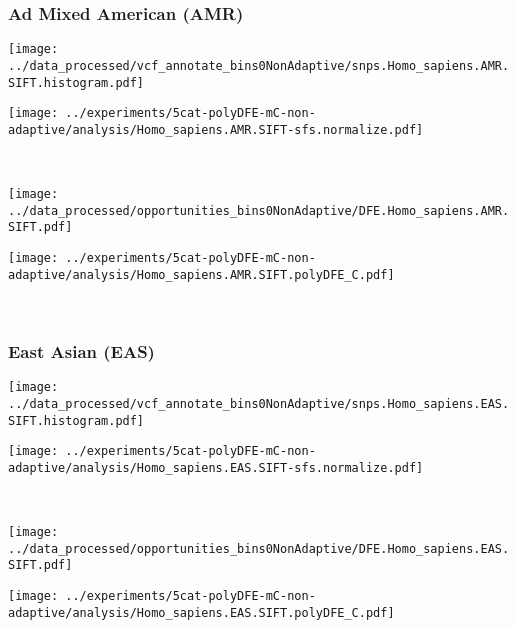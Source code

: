 \subsubsection{Ad Mixed American (AMR)}

\begin{minipage}{0.49\linewidth}
    \texttt{[image: ../data\_processed/vcf\_annotate\_bins0NonAdaptive/snps.Homo\_sapiens.AMR.SIFT.histogram.pdf]}
\end{minipage}
\begin{minipage}{0.49\linewidth}
    \texttt{[image: ../experiments/5cat-polyDFE-mC-non-adaptive/analysis/Homo\_sapiens.AMR.SIFT-sfs.normalize.pdf]}
\end{minipage}
\\
\begin{minipage}{0.49\linewidth}
    \texttt{[image: ../data\_processed/opportunities\_bins0NonAdaptive/DFE.Homo\_sapiens.AMR.SIFT.pdf]}
\end{minipage}
\begin{minipage}{0.49\linewidth}
    \texttt{[image: ../experiments/5cat-polyDFE-mC-non-adaptive/analysis/Homo\_sapiens.AMR.SIFT.polyDFE\_C.pdf]}
\end{minipage}
\\

\subsubsection{East Asian (EAS)}

\begin{minipage}{0.49\linewidth}
    \texttt{[image: ../data\_processed/vcf\_annotate\_bins0NonAdaptive/snps.Homo\_sapiens.EAS.SIFT.histogram.pdf]}
\end{minipage}
\begin{minipage}{0.49\linewidth}
    \texttt{[image: ../experiments/5cat-polyDFE-mC-non-adaptive/analysis/Homo\_sapiens.EAS.SIFT-sfs.normalize.pdf]}
\end{minipage}
\\
\begin{minipage}{0.49\linewidth}
    \texttt{[image: ../data\_processed/opportunities\_bins0NonAdaptive/DFE.Homo\_sapiens.EAS.SIFT.pdf]}
\end{minipage}
\begin{minipage}{0.49\linewidth}
    \texttt{[image: ../experiments/5cat-polyDFE-mC-non-adaptive/analysis/Homo\_sapiens.EAS.SIFT.polyDFE\_C.pdf]}
\end{minipage}
\\

